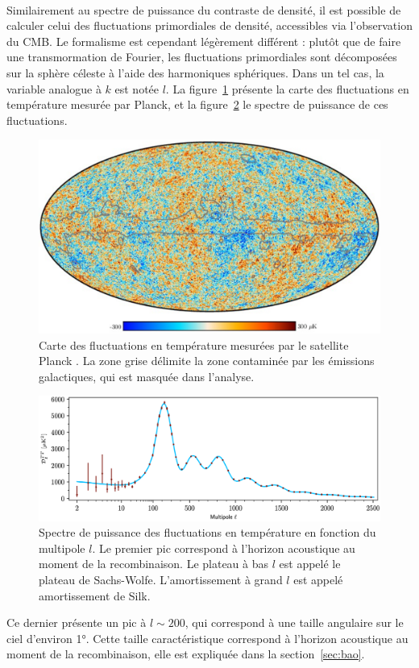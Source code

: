 \paragraph{}
Similairement au spectre de puissance du contraste de densité, il est possible de calculer celui des fluctuations primordiales de densité, accessibles via l'observation du CMB. Le formalisme est cependant légèrement différent : plutôt que de faire une transmormation de Fourier, les fluctuations primordiales sont décomposées sur la sphère céleste à l'aide des harmoniques sphériques. Dans un tel cas, la variable analogue à $k$ est notée $l$. La figure~\ref{fig:carte_cmb} présente la carte des fluctuations en température mesurée par Planck, et la figure~\ref{fig:spectre_cmb} le spectre de puissance de ces fluctuations.
\begin{figure}
  \centering
  \includegraphics[scale=0.3]{carte_cmb}
  \caption{Carte des fluctuations en température mesurées par le satellite Planck \autocite{Aghanim2019}. La zone grise délimite la zone contaminée par les émissions galactiques, qui est masquée dans l'analyse.}
  \label{fig:carte_cmb}
\end{figure}
\begin{figure}
  \centering
  \includegraphics[scale=0.4]{spectre_cmb}
  \caption{Spectre de puissance des fluctuations en température en fonction du multipole $l$. Le premier pic correspond à l'horizon acoustique au moment de la recombinaison. Le plateau à bas $l$ est appelé le plateau de Sachs-Wolfe. L'amortissement à grand $l$ est appelé amortissement de Silk.}
  \label{fig:spectre_cmb}
\end{figure}
Ce dernier présente un pic à $l \sim 200$, qui correspond à une taille angulaire sur le ciel d'environ \ang{1}. Cette taille caractéristique correspond à l'horizon acoustique au moment de la recombinaison, elle est expliquée dans la section~\ref{sec:bao}.

